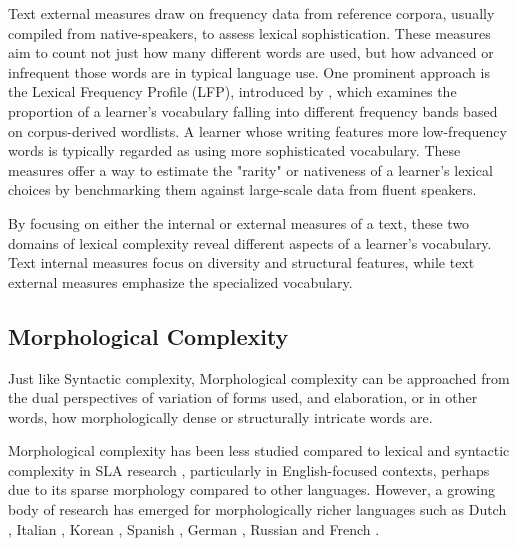 Text external measures draw on frequency data from reference corpora, usually compiled from native-speakers, to
assess lexical sophistication.
These
measures aim
to count not just how many different words are used, but how advanced or infrequent those words are in
typical
language
use. One prominent approach is the Lexical Frequency Profile (LFP), introduced by \citet{Laufer1995}, which examines
the proportion of a learner's vocabulary falling into different frequency bands based on corpus-derived wordlists. A
learner whose writing features more low-frequency words is typically regarded as using more sophisticated vocabulary.
These measures offer a way to estimate the "rarity" or nativeness of a learner's lexical choices by benchmarking
them against large-scale data from fluent speakers.

By focusing on either the internal or external measures of a text, these two domains of lexical complexity
reveal different aspects of a learner's vocabulary. Text internal measures focus on diversity and structural
features, while text external measures emphasize the specialized vocabulary.

\subsection{Morphological Complexity}
Just like
Syntactic complexity, Morphological
complexity can be approached from the dual perspectives of variation of forms used, and
    elaboration, or in other words, how morphologically dense or structurally intricate words are.

Morphological complexity has been less studied
compared to lexical and syntactic complexity in SLA research \citep{Butle2012}, particularly in English-focused
contexts, perhaps due to its sparse morphology compared to other languages. However, a growing body of research has
emerged for
morphologically richer
languages such as Dutch \citep{vanderslik2019}, Italian
\citep{Brezina2019,dellorletta2011,Romano2017}, Korean \citep{Hwang2024},  Spanish \citep{Garcia2021, Malvern2004}, German
\citep{hancke2012-readability},
Russian \citep{reynolds2016-insights} and
French \citep{DeClercq2019,francois2012-ai}.

